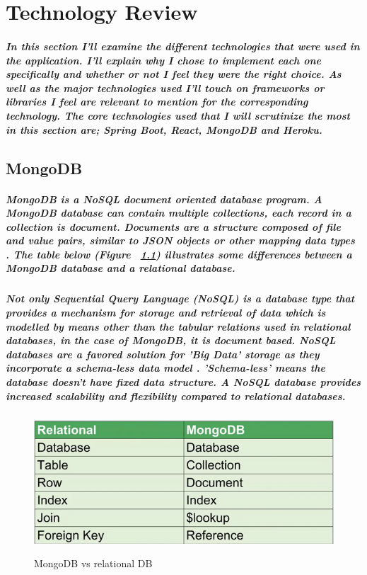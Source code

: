 \chapter{Technology Review}
\paragraph{In this section I'll examine the different technologies that were used in the application. I'll explain why I chose to implement each one specifically and whether or not I feel they were the right choice. As well as the major technologies used I'll touch on frameworks or libraries I feel are relevant to mention for the corresponding technology. The core technologies used that I will scrutinize the most in this section are; Spring Boot, React, MongoDB and Heroku.}

\section{MongoDB}
\paragraph{MongoDB is a NoSQL document oriented database program. A MongoDB database can contain multiple collections, each record in a collection is document. Documents are a structure composed of file and value pairs, similar to JSON objects or other mapping data types \cite{Mongo:doc}. The table below (Figure ~\ref{mongo2_label}) illustrates some differences between a MongoDB database and a relational database.}
\paragraph{Not only Sequential Query Language (NoSQL) is a database type that provides a mechanism for storage and retrieval of data which is modelled by means other than the tabular relations used in relational databases, in the case of MongoDB, it is document based. NoSQL databases are a favored solution for 'Big Data' storage as they incorporate a schema-less data model \cite{wiki:nosql}. 'Schema-less' means the database doesn't have fixed data structure. A NoSQL database provides increased scalability and ﬂexibility compared to relational databases.}
\begin{figure}[h]
    \centering
    \includegraphics[scale=0.4]{Images/mongo2.png} 
    \label{mongo2_label}
    \caption{MongoDB vs relational DB}
\end{figure}

